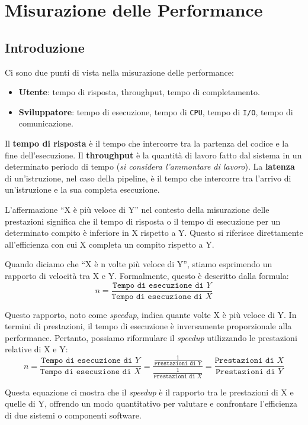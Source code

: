 \chapter{Misurazione delle Performance}
\section{Introduzione}

Ci sono due punti di vista nella misurazione delle performance:
\begin{itemize}
  \item \textbf{Utente}: tempo di risposta, throughput,
  tempo di completamento.
  \item \textbf{Sviluppatore}: tempo di esecuzione,
  tempo di \texttt{CPU}, tempo di \texttt{I/O}, tempo di comunicazione.
\end{itemize}

Il \textbf{tempo di risposta} è il tempo che intercorre tra la
partenza del codice e la fine dell'esecuzione. Il
\textbf{throughput} è la quantità di lavoro fatto dal
sistema in un determinato periodo di tempo
(\textit{si considera l'ammontare di lavoro}). La
\textbf{latenza} di un'istruzione, nel caso della
pipeline, è il tempo che intercorre tra l'arrivo
di un'istruzione e la sua completa esecuzione.

L'affermazione ``X è più veloce di Y'' nel contesto
della misurazione delle prestazioni significa che
il tempo di risposta o il tempo di esecuzione per
un determinato compito è inferiore in X rispetto a Y.
Questo si riferisce direttamente all'efficienza con cui
X completa un compito rispetto a Y.

Quando diciamo che ``X è n volte più veloce di Y'',
stiamo esprimendo un rapporto di velocità tra X e Y.
Formalmente, questo è descritto dalla formula:
\[
n = \frac{\texttt{Tempo di esecuzione di } Y}
{\texttt{Tempo di esecuzione di } X}
\]

Questo rapporto, noto come \textit{speedup}, 
indica quante volte X è più veloce di Y. In termini
di prestazioni, il tempo di esecuzione è inversamente
proporzionale alla performance. Pertanto, possiamo riformulare il \textit{speedup} utilizzando le prestazioni relative di X e Y:
\[
n = \frac{\texttt{Tempo di esecuzione di } Y}
{\texttt{Tempo di esecuzione di } X} = \frac{\frac{1}
{\texttt{Prestazioni di } Y}}
{\frac{1}{\texttt{Prestazioni di }X}} =
\frac{\texttt{Prestazioni di } X}{\texttt{Prestazioni di } Y}
\]

Questa equazione ci mostra che il \textit{speedup} è
il rapporto tra le prestazioni di X e quelle di Y,
offrendo un modo quantitativo per valutare e confrontare
l'efficienza di due sistemi o componenti software.


